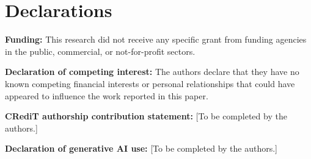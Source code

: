\documentclass[preprint,12pt]{elsarticle}
\begin{document}
\section*{Declarations}

\textbf{Funding:} This research did not receive any specific grant from funding agencies in the public, commercial, or not-for-profit sectors.

\textbf{Declaration of competing interest:} The authors declare that they have no known competing financial interests or personal relationships that could have appeared to influence the work reported in this paper.

\textbf{CRediT authorship contribution statement:} [To be completed by the authors.]

\textbf{Declaration of generative AI use:} [To be completed by the authors.]



\end{document}
